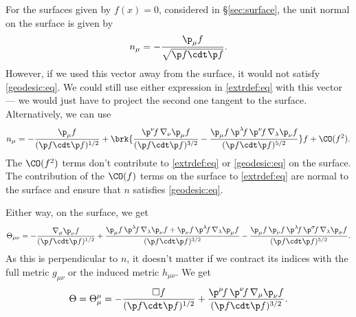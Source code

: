 \begin{subappendices}
For the surfaces given by $f(x)=0$, considered in \S\ref{sec:surface}, the unit normal on the surface is given by
%
\begin{equation}\label{normonsurf:eq}
  n_\mu = -\frac{\p_\mu f}{\sqrt{\p f \cdt \p f}}.
\end{equation}
%
However, if we used this vector away from the surface, it would not satisfy \eqref{geodesic:eq}. We could still use either expression in \eqref{extrdef:eq} with this vector --- we would just have to project the second one tangent to the surface. Alternatively, we can use
%
\begin{equation}\label{normoffsurf:eq}
  n_\mu = -\frac{\p_\mu f}{(\p f \cdt \p f)^{1/2}}
   +\brk{ \frac{\p^\nu\! f\, \nabla_\nu \p_\mu f}{(\p f \cdt \p f)^{3/2}}
      - \frac{\p_\mu f\, \p^\lambda\! f\, \p^\nu\! f\, \nabla_\lambda \p_\nu f}{(\p f \cdt \p f)^{5/2}} } f
   + \CO(f^2).
\end{equation}
%
The $\CO(f^2)$ terms don't contribute to \eqref{extrdef:eq} or \eqref{geodesic:eq} on the surface. The contribution of the $\CO(f)$ terms on the surface to \eqref{extrdef:eq} are normal to the surface and ensure that $n$ satisfies \eqref{geodesic:eq}.

Either way, on the surface, we get
%
\begin{equation}\label{extrsurf:eq}
  \Theta_{\mu\nu} = -\frac{\nabla_\mu \p_\nu f}{(\p f \cdt \p f)^{1/2}}
    + \frac{\p_\mu f\, \p^\lambda\! f\, \nabla_\lambda \p_\nu f + \p_\nu f\, \p^\lambda\! f\, \nabla_\lambda \p_\mu f}
           {(\p f \cdt \p f)^{3/2}}
    - \frac{\p_\mu f\, \p_\nu f\, \p^\lambda\! f\, \p^\sigma\! f\, \nabla_\lambda \p_\sigma f}
           {(\p f \cdt \p f)^{5/2}}.
\end{equation}
%
As this is perpendicular to $n$, it doesn't matter if we contract its indices with the full metric $g_{\mu\nu}$ or the induced metric $h_{\mu\nu}$. We get
%
\begin{equation}\label{trextrsurf:eq}
  \Theta = \Theta_\mu^\mu = -\frac{\square f}{(\p f \cdt \p f)^{1/2}}
    + \frac{\p^\mu\! f\, \p^\nu\! f\, \nabla_\mu \p_\nu f}
           {(\p f \cdt \p f)^{3/2}}.
\end{equation}
%


\end{subappendices}
